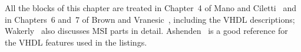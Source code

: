 All the blocks of this chapter are treated in Chapter~4 of Mano and Ciletti~\cite{mano2018} and in Chapters~6 and~7 of Brown and Vranesic~\cite{brown2009}, including the VHDL descriptions; Wakerly~\cite{wakerly2006} also discusses MSI parts in detail. Ashenden~\cite{ashenden2008} is a good reference for the VHDL features used in the listings.
